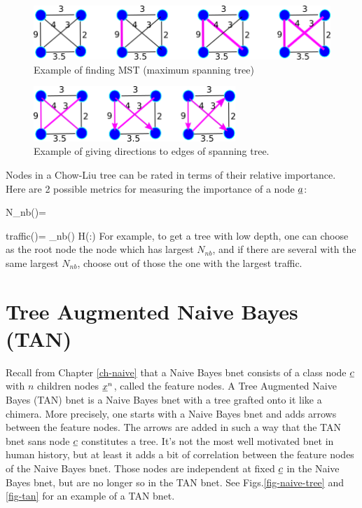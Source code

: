 \begin{figure}[h!]
\centering
\includegraphics[width=5in]
{chow/spanning-tree.png}
\caption{
Example of finding MST (maximum spanning tree)} 
\label{fig-spanning-tree}
\end{figure}

\begin{figure}[h!]
\centering
\includegraphics[width=3in]
{chow/tree-dir.png}
\caption{Example of giving directions
to edges of spanning tree.} 
\label{fig-tree-dir}
\end{figure}

Nodes in a Chow-Liu tree can
be rated in
terms
of their relative importance.
Here are 2 possible
metrics
for measuring 
the importance
of a node ${\underline{a}}$:

\beq
N_{nb}(\rva)=
\eeq

\beq
{\rm traffic}(\rva)=
\sum_{\rvn\in nb(\rva)}
H(\rva:\rvn)
\eeq
For example,
to get a tree with low depth, 
one can choose
as the root node
the node which has 
largest $N_{nb}$, and
if there are several
with the same largest $N_{nb}$,
choose out of those the 
one with the largest traffic.


\section{Tree Augmented Naive Bayes (TAN)}

Recall from Chapter \ref{ch-naive}
that a Naive
Bayes bnet
consists
of  a class node ${\underline{c}}$
with
$n$ children nodes
${\underline{x}}^n$, called the feature nodes. A
Tree Augmented Naive Bayes (TAN) bnet
is a Naive Bayes bnet with 
a 
tree grafted onto it like a chimera.
More precisely,
one starts
with a Naive Bayes bnet 
and adds arrows between
the feature nodes.
The arrows are added in such a way
that the TAN bnet sans node ${\underline{c}}$
constitutes a tree.
It's not the most well 
motivated bnet in human
history,
but at least
it adds a bit
of correlation between
the feature nodes
of the Naive Bayes bnet.
Those nodes are independent
at fixed ${\underline{c}}$
in the Naive Bayes
bnet, but are no longer so
in the TAN bnet.
See Figs.\ref{fig-naive-tree}
and \ref{fig-tan}
for an example of a TAN bnet.



